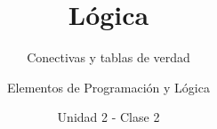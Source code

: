 \documentclass[usenames,dvipsnames]{../../common/beamerUNQaccessible}
\title{Lógica}
\subtitle{Conectivas y tablas de verdad}
\author{Elementos de Programación y Lógica}
\date{Unidad 2 - Clase 2}
\begin{document}
  \titleframe
  \toc
  
  \finaltitleframe
\end{document}

